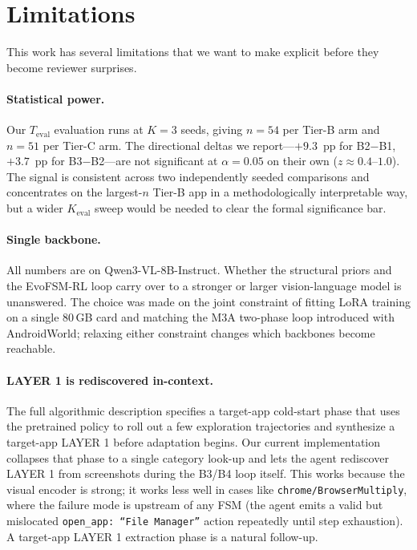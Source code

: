 \section*{Limitations}
\label{sec:limitations}

This work has several limitations that we want to make explicit before they become reviewer surprises.

\paragraph{Statistical power.} Our $T_{\text{eval}}$ evaluation runs at $K{=}3$ seeds, giving $n{=}54$ per Tier-B arm and $n{=}51$ per Tier-C arm. The directional deltas we report---$+9.3$~pp for B2$-$B1, $+3.7$~pp for B3$-$B2---are not significant at $\alpha=0.05$ on their own ($z\approx 0.4$--$1.0$). The signal is consistent across two independently seeded comparisons and concentrates on the largest-$n$ Tier-B app in a methodologically interpretable way, but a wider $K_{\text{eval}}$ sweep would be needed to clear the formal significance bar.

\paragraph{Single backbone.} All numbers are on Qwen3-VL-8B-Instruct. Whether the structural priors and the EvoFSM-RL loop carry over to a stronger or larger vision-language model is unanswered. The choice was made on the joint constraint of fitting LoRA training on a single 80\,GB card and matching the M3A two-phase loop introduced with AndroidWorld; relaxing either constraint changes which backbones become reachable.

\paragraph{LAYER 1 is rediscovered in-context.} The full algorithmic description specifies a target-app cold-start phase that uses the pretrained policy to roll out a few exploration trajectories and synthesize a target-app LAYER 1 before adaptation begins. Our current implementation collapses that phase to a single category look-up and lets the agent rediscover LAYER 1 from screenshots during the B3/B4 loop itself. This works because the visual encoder is strong; it works less well in cases like \texttt{chrome/BrowserMultiply}, where the failure mode is upstream of any FSM (the agent emits a valid but mislocated \texttt{open\_app: ``File Manager''} action repeatedly until step exhaustion). A target-app LAYER 1 extraction phase is a natural follow-up.

